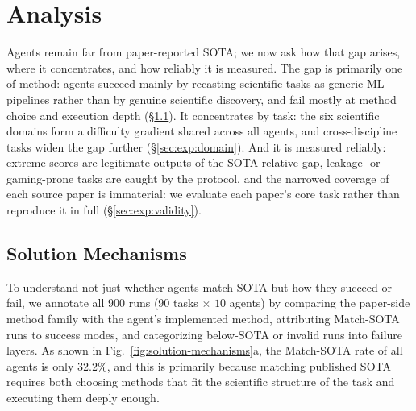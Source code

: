 \documentclass{llmxive}
\begin{document}
 
 
 
 
 
 
 
 
 

 
 
 
 
 
 
 
 
 
 
 
 
 
 
 
 
 
 
 
 
 
 
 
 
 
 
 
 
 
 
 
 
 
 
 
 
 
 
 

\section{Analysis}
\label{sec:analysis}

Agents remain far from paper-reported SOTA; we now ask how that gap arises, where it concentrates, and how reliably it is measured. The gap is primarily one of method: agents succeed mainly by recasting scientific tasks as generic ML pipelines rather than by genuine scientific discovery, and fail mostly at method choice and execution depth (\S\ref{sec:exp:discovery-modes}). It concentrates by task: the six scientific domains form a difficulty gradient shared across all agents, and cross-discipline tasks widen the gap further (\S\ref{sec:exp:domain}). And it is measured reliably: extreme scores are legitimate outputs of the SOTA-relative gap, leakage- or gaming-prone tasks are caught by the protocol, and the narrowed coverage of each source paper is immaterial: we evaluate each paper's core task rather than reproduce it in full (\S\ref{sec:exp:validity}).

\subsection{Solution Mechanisms}
\label{sec:exp:discovery-modes}

To understand not just whether agents match SOTA but how they succeed or fail, we annotate all $900$ runs ($90$ tasks $\times$ $10$ agents) by comparing the paper-side method family with the agent's implemented method, attributing Match-SOTA runs to success modes, and categorizing below-SOTA or invalid runs into failure layers. As shown in Fig.~\ref{fig:solution-mechanisms}a, the Match-SOTA rate of all agents is only $32.2\%$, and this is primarily because matching published SOTA requires both choosing methods that fit the scientific structure of the task and executing them deeply enough.
\end{document}
